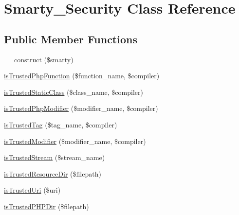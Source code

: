 \hypertarget{class_smarty___security}{}\section{Smarty\+\_\+\+Security Class Reference}
\label{class_smarty___security}
\subsection*{Public Member Functions}
\begin{DoxyCompactItemize}
\item 
\hyperlink{class_smarty___security_a7913fd4038ea6c7d99e49bd3ba9028ca}{\+\_\+\+\_\+construct} (\$smarty)
\item 
\hyperlink{class_smarty___security_a1c3bb26febe9c5abd37e7ff8cdce46be}{is\+Trusted\+Php\+Function} (\$function\+\_\+name, \$compiler)
\item 
\hyperlink{class_smarty___security_a9a4cceec7287368a9e015502b1e91887}{is\+Trusted\+Static\+Class} (\$class\+\_\+name, \$compiler)
\item 
\hyperlink{class_smarty___security_a77c41bf39b1a8da4b9ba860bc3e60cf2}{is\+Trusted\+Php\+Modifier} (\$modifier\+\_\+name, \$compiler)
\item 
\hyperlink{class_smarty___security_ad9ce0943f892bf751358992b0db54375}{is\+Trusted\+Tag} (\$tag\+\_\+name, \$compiler)
\item 
\hyperlink{class_smarty___security_a503165596f59f6496cd9ea55ad8b36e1}{is\+Trusted\+Modifier} (\$modifier\+\_\+name, \$compiler)
\item 
\hyperlink{class_smarty___security_a078d58aafa3e3322ebc8dca910a1a36d}{is\+Trusted\+Stream} (\$stream\+\_\+name)
\item 
\hyperlink{class_smarty___security_a08edb5e1a5d054928bb9d5aff8f7aa0f}{is\+Trusted\+Resource\+Dir} (\$filepath)
\item 
\hyperlink{class_smarty___security_a5b20c21ee6e41e8ff29e5f7a6671f095}{is\+Trusted\+Uri} (\$uri)
\item 
\hyperlink{class_smarty___security_a3d2102d8957efd78fe8866fb26940c6e}{is\+Trusted\+P\+H\+P\+Dir} (\$filepath)
\end{DoxyCompactItemize}
